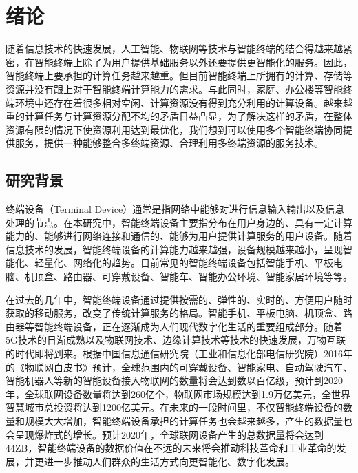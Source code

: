 \chapter{绪论}\label{chap:introduction}

随着信息技术的快速发展，人工智能、物联网等技术与智能终端的结合得越来越紧密，在智能终端上除了为用户提供基础服务以外还要提供更智能化的服务。因此，智能终端上要承担的计算任务越来越重。但目前智能终端上所拥有的计算、存储等资源并没有跟上对于智能终端计算能力的需求。与此同时，家庭、办公楼等智能终端环境中还存在着很多相对空闲、计算资源没有得到充分利用的计算设备。越来越重的计算任务与计算资源分配不均的矛盾日益凸显，为了解决这样的矛盾，在整体资源有限的情况下使资源利用达到最优化，我们想到可以使用多个智能终端协同提供服务，提供一种能够整合多终端资源、合理利用多终端资源的服务技术。

\section{研究背景}

终端设备（Terminal Device）通常是指网络中能够对进行信息输入输出以及信息处理的节点\citep{2004支持普适计算的智能终端服务及设备管理技术研究}。在本研究中，智能终端设备主要指分布在用户身边的、具有一定计算能力的、能够进行网络连接和通信的、能够为用户提供计算服务的用户设备。随着信息技术的发展，智能终端设备的计算能力越来越强，设备规模越来越小，呈现智能化、轻量化、网络化的趋势。目前常见的智能终端设备包括智能手机、平板电脑、机顶盒、路由器、可穿戴设备、智能车、智能办公环境、智能家居环境等等。

在过去的几年中，智能终端设备通过提供按需的、弹性的、实时的、方便用户随时获取的移动服务，改变了传统计算服务的格局\citep{施巍松2017边缘计算}。智能手机、平板电脑、机顶盒、路由器等智能终端设备，正在逐渐成为人们现代数字化生活的重要组成部分。随着5G技术的日渐成熟以及物联网技术、边缘计算技术等技术的快速发展，万物互联的时代即将到来。根据中国信息通信研究院（工业和信息化部电信研究院）2016年的《物联网白皮书》预计，全球范围内的可穿戴设备、智能家电、自动驾驶汽车、智能机器人等新的智能设备接入物联网的数量将会达到数以百亿级，预计到2020年，全球联网设备数量将达到260亿个，物联网市场规模达到1.9万亿美元，全世界智慧城市总投资将达到1200亿美元\citep{物联网白皮书2016}。在未来的一段时间里，不仅智能终端设备的数量和规模大大增加，智能终端设备承担的计算任务也会越来越多，产生的数据量也会呈现爆炸式的增长。预计2020年，全球联网设备产生的总数据量将会达到44ZB\citep{物联网白皮书2016}，智能终端设备的数据价值在不远的未来将会推动科技革命和工业革命的发展，并更进一步推动人们群众的生活方式向更智能化、数字化发展。

